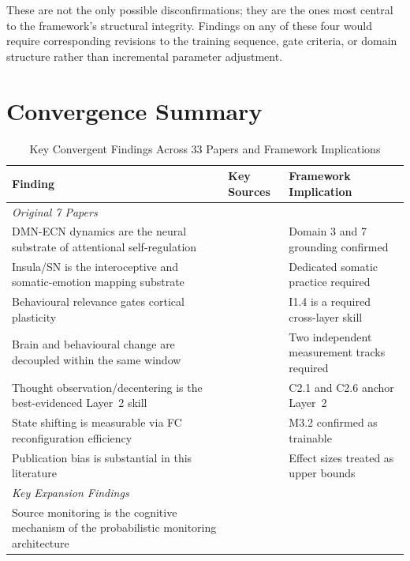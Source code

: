 \documentclass[12pt, a4paper]{article}
\begin{document}
These are not the only possible disconfirmations; they are the ones most central
to the framework's structural integrity. Findings on any of these four would
require corresponding revisions to the training sequence, gate criteria, or
domain structure rather than incremental parameter adjustment.

\section{Convergence Summary}

\begin{table}[htbp]
\centering
\caption{Key Convergent Findings Across 33 Papers and Framework Implications}
\label{tab:convergence}
\small
\begin{tabular}{p{5.5cm}p{3.5cm}p{4cm}}
\toprule
\textbf{Finding} & \textbf{Key Sources} & \textbf{Framework Implication} \\
\midrule
\multicolumn{3}{l}{\textit{Original 7 Papers}} \\
DMN-ECN dynamics are the neural substrate of attentional self-regulation &
  \citet{ganesan2025, yue2023} & Domain 3 and 7 grounding confirmed \\
Insula/SN is the interoceptive and somatic-emotion mapping substrate &
  \citet{calderone2024, yue2023} & Dedicated somatic practice required \\
Behavioural relevance gates cortical plasticity &
  \citet{fallon2009, beyeler2017} & I1.4 is a required cross-layer skill \\
Brain and behavioural change are decoupled within the same window &
  \citet{yue2023} & Two independent measurement tracks required \\
Thought observation/decentering is the best-evidenced Layer~2 skill &
  \citet{ganesan2025, gkintoni2025} & C2.1 and C2.6 anchor Layer~2 \\
State shifting is measurable via FC reconfiguration efficiency &
  \citet{yue2023} & M3.2 confirmed as trainable \\
Publication bias is substantial in this literature &
  \citet{gkintoni2025} & Effect sizes treated as upper bounds \\[6pt]
\multicolumn{3}{l}{\textit{Key Expansion Findings}} \\
Source monitoring is the cognitive mechanism of the probabilistic monitoring architecture &

\end{tabular}
\end{table}
\end{document}
